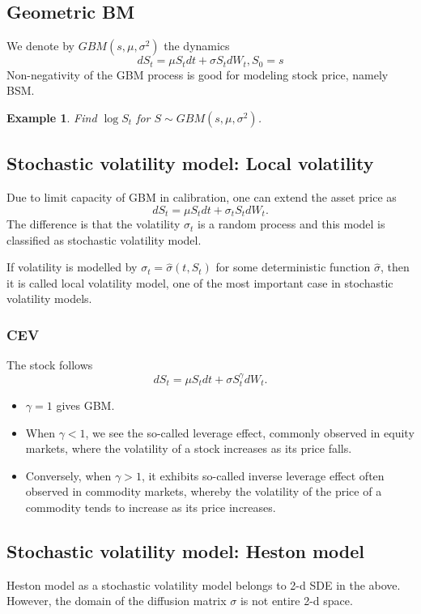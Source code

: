 \documentclass{article}
\newtheorem{example}{Example}
\begin{document}
\subsection{Geometric BM}
We denote by $GBM(s, \mu, \sigma^2)$ the dynamics
$$d S_t = \mu S_t dt + \sigma S_t dW_t, S_{0} = s$$
Non-negativity of the GBM process is good for modeling stock price, namely BSM.
\begin{example}
\label{exm:gbm01}
Find $\log S_t$ for $S \sim GBM(s, \mu, \sigma^2)$.
\end{example}

\subsection{Stochastic volatility model: Local volatility}
Due to limit capacity of GBM in calibration, one can extend the asset price as
$$d S_t = \mu S_t dt + \sigma_t S_t dW_t.$$
The difference is that the volatility $\sigma_t$ is a random process and this model is classified as stochastic volatility model.

If volatility is modelled by $\sigma_t = \hat \sigma(t, S_t)$ for some deterministic function $\hat \sigma$, then it is called local volatility model, one of the most important case in stochastic volatility models.
\subsubsection{CEV}
The stock follows
$$d S_{t} = \mu S_{t} dt + \sigma S_{t}^{\gamma} dW_{t}.$$
\begin{itemize}
\item $\gamma = 1$ gives GBM.
 \item  When $\gamma <1$,  we see the so-called leverage effect, commonly observed in equity markets, where the volatility of a stock increases as its price falls. 
 \item Conversely, when $\gamma >1$, it exhibits so-called inverse leverage effect often observed in commodity markets, whereby the volatility of the price of a commodity tends to increase as its price increases.
\end{itemize}

\subsection{Stochastic volatility model: Heston model}
Heston model as a stochastic volatility model belongs to 2-d SDE in the above. However, the domain of the diffusion matrix $\sigma$ is not entire 2-d space. 
\end{document}
